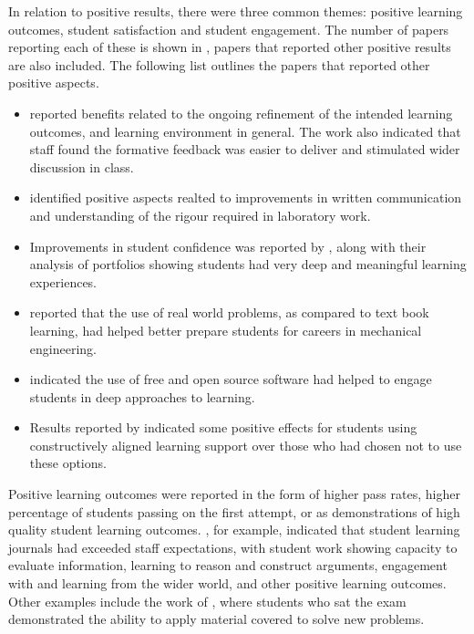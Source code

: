 In relation to positive results, there were three common themes: positive learning outcomes, student satisfaction and student engagement. The number of papers reporting each of these is shown in , papers that reported other positive results are also included. The following list outlines the papers that reported other positive aspects.

\begin{itemize}[noitemsep,nolistsep]
	\item \citet{Hill:2009} reported benefits related to the ongoing refinement of the intended learning outcomes, and learning environment in general. The work also indicated that staff found the formative feedback was easier to deliver and stimulated wider discussion in class.
	\item \citet{Morton:2008} identified positive aspects realted to improvements in written communication and understanding of the rigour required in laboratory work.
	\item Improvements in student confidence was reported by \citet{scott2009promoting}, along with their analysis of portfolios showing students had very deep and meaningful learning experiences.
	\item \citet{Schaefer:2009} reported that the use of real world problems, as compared to text book learning, had helped better prepare students for careers in mechanical engineering.
	\item \citet{Vanfretti:2011} indicated the use of free and open source software had helped to engage students in deep approaches to learning.
	\item Results reported by \citet{Vogel:2007} indicated some positive effects for students using constructively aligned learning support over those who had chosen not to use these options. 
\end{itemize}

Positive learning outcomes were reported in the form of higher pass rates, higher percentage of students passing on the first attempt, or as demonstrations of high quality student learning outcomes. \citet{Szili:2011}, for example, indicated that student learning journals had exceeded staff expectations, with student work showing capacity to evaluate information, learning to reason and construct arguments, engagement with and learning from the wider world, and other positive learning outcomes. Other examples include the work of \citet{warren2005teaching}, where students who sat the exam demonstrated the ability to apply material covered to solve new problems.

